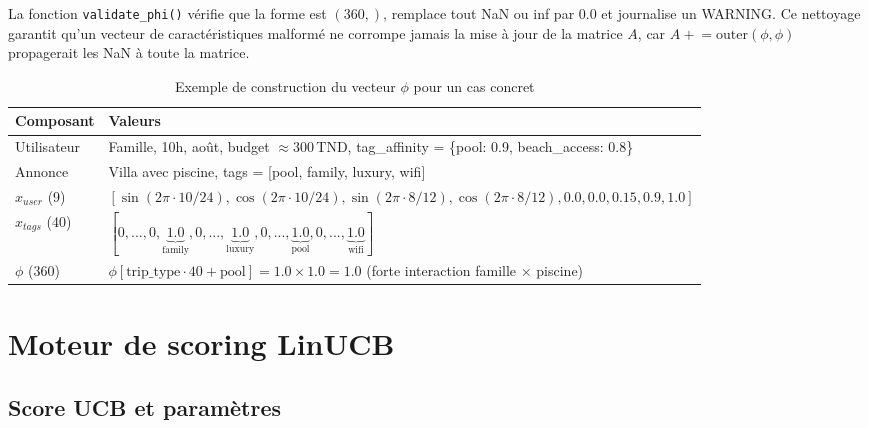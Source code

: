 La fonction \texttt{validate\_phi()} vérifie que la forme est $(360,)$, remplace tout NaN
ou inf par 0.0 et journalise un WARNING. Ce nettoyage garantit qu'un vecteur de
caractéristiques malformé ne corrompe jamais la mise à jour de la matrice $A$, car
$A \mathrel{+}= \text{outer}(\phi, \phi)$ propagerait les NaN à toute la matrice.

\begin{table}[H]
    \centering
    \caption{Exemple de construction du vecteur $\phi$ pour un cas concret}
    \label{tab:phi_example}
    \small
    \begin{tabular}{p{2.5cm} p{11cm}}
        \toprule
        \textbf{Composant} & \textbf{Valeurs} \\
        \midrule
        Utilisateur & Famille, 10h, août, budget $\approx 300$\,TND,
                       tag\_affinity = \{pool: 0.9, beach\_access: 0.8\} \\[3pt]
        Annonce & Villa avec piscine, tags = [pool, family, luxury, wifi] \\[3pt]
        $x_{user}$ (9) & $[\sin(2\pi\cdot10/24), \cos(2\pi\cdot10/24),
                    \sin(2\pi\cdot8/12), \cos(2\pi\cdot8/12),
                    0.0, 0.0, 0.15, 0.9, 1.0]$ \\[3pt]
        $x_{tags}$ (40) & $[0,...,0, \underbrace{1.0}_{\text{family}},
                    0,..., \underbrace{1.0}_{\text{luxury}}, 0,...,
                    \underbrace{1.0}_{\text{pool}}, 0,...,
                    \underbrace{1.0}_{\text{wifi}}]$ \\[3pt]
        $\phi$ (360) & $\phi[\text{trip\_type} \cdot 40 + \text{pool}]
                    = 1.0 \times 1.0 = 1.0$ (forte interaction
                    famille $\times$ piscine) \\
        \bottomrule
    \end{tabular}
\end{table}


\section{Moteur de scoring LinUCB}

\subsection{Score UCB et paramètres}

